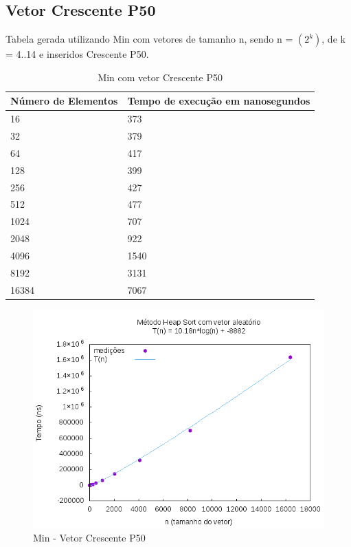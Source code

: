 \documentclass[12pt,a4paper,twoside]{report}
\begin{document}
\subsection{Vetor Crescente P50}
Tabela gerada utilizando Min com vetores de tamanho n, sendo n = $(2^k)$, de k = 4..14 e inseridos Crescente P50.
\begin{table}[H]
\centering
\caption{Min com vetor Crescente P50}
\label{my-label}
\begin{tabular}{|l|l|}
\hline
\multicolumn{1}{|c|}{\textbf{Número de Elementos}} & \multicolumn{1}{c|}{\textbf{Tempo de execução em nanosegundos}} \\ \hline
16 & 373 \\ \hline
32 & 379 \\ \hline
64 & 417 \\ \hline
128 & 399 \\ \hline
256 & 427 \\ \hline
512 & 477 \\ \hline
1024 & 707 \\ \hline
2048 & 922 \\ \hline
4096 & 1540 \\ \hline
8192 & 3131 \\ \hline
16384 & 7067 \\ \hline
\end{tabular}
\end{table}

\begin{figure}[H]
    \centering
    \includegraphics[width=0.7\linewidth]{graficos/HeapSort/vIntAleatorio/vIntAleatorio.png}
  \caption{Min - Vetor Crescente P50}
\end{figure}
\end{document}
